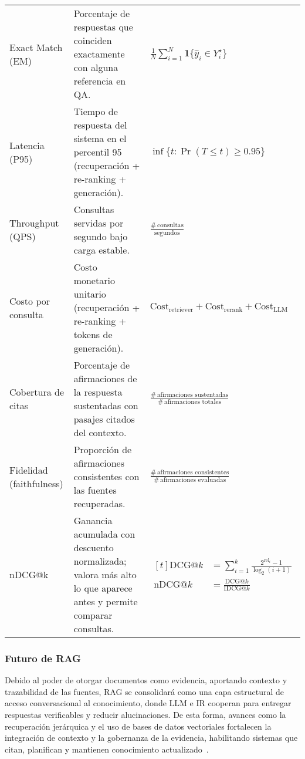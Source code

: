 \begin{tabularx}{\textwidth}{L{0.22\textwidth} Y C{0.34\textwidth}}
    Exact Match (EM) & Porcentaje de respuestas que coinciden exactamente con alguna referencia en QA. &
    $\displaystyle \frac{1}{N}\sum_{i=1}^{N}\mathbf{1}\{\hat{y}_i\in Y_i^{\star}\}$ \\[4pt]

    Latencia (P95) & Tiempo de respuesta del sistema en el percentil 95 (recuperación + re-ranking + generación). &
    $\displaystyle \inf\{t:\Pr(T\le t)\ge 0.95\}$ \\[4pt]

    Throughput (QPS) & Consultas servidas por segundo bajo carga estable. &
    $\displaystyle \frac{\#\,\text{consultas}}{\text{segundos}}$ \\[4pt]

    Costo por consulta & Costo monetario unitario (recuperación + re-ranking + tokens de generación). &
    $\displaystyle \mathrm{Cost}_{\text{retriever}}+\mathrm{Cost}_{\text{rerank}}+\mathrm{Cost}_{\text{LLM}}$ \\[4pt]

    Cobertura de citas & Porcentaje de afirmaciones de la respuesta sustentadas con pasajes citados del contexto. &
    $\displaystyle \frac{\#\,\text{afirmaciones sustentadas}}{\#\,\text{afirmaciones totales}}$ \\[4pt]

    Fidelidad (faithfulness) & Proporción de afirmaciones consistentes con las fuentes recuperadas. &
    $\displaystyle \frac{\#\,\text{afirmaciones consistentes}}{\#\,\text{afirmaciones evaluadas}}$ \\[4pt]

    nDCG@k & Ganancia acumulada con descuento normalizada; valora más alto lo que aparece antes y permite comparar consultas. &
    $\displaystyle
    \begin{aligned}[t]
        \mathrm{DCG}@k &= \sum_{i=1}^{k}\frac{2^{\mathrm{rel}_i}-1}{\log_2(i+1)}\\
        \mathrm{nDCG}@k &= \frac{\mathrm{DCG}@k}{\mathrm{IDCG}@k}
    \end{aligned}
    $\\
    \bottomrule
\end{tabularx}





\subsubsection{Futuro de RAG}

Debido al poder de otorgar documentos como evidencia, aportando contexto y trazabilidad de las fuentes, RAG se consolidará como una capa estructural de acceso conversacional
 al conocimiento, donde LLM e IR cooperan para entregar respuestas verificables y reducir alucinaciones. De esta forma, avances como la recuperación jerárquica y el uso de bases de datos vectoriales 
  fortalecen la integración de contexto y la gobernanza de la evidencia, habilitando sistemas que citan, planifican y mantienen 
 conocimiento actualizado~\parencite{zhai2024llmIR}. 

